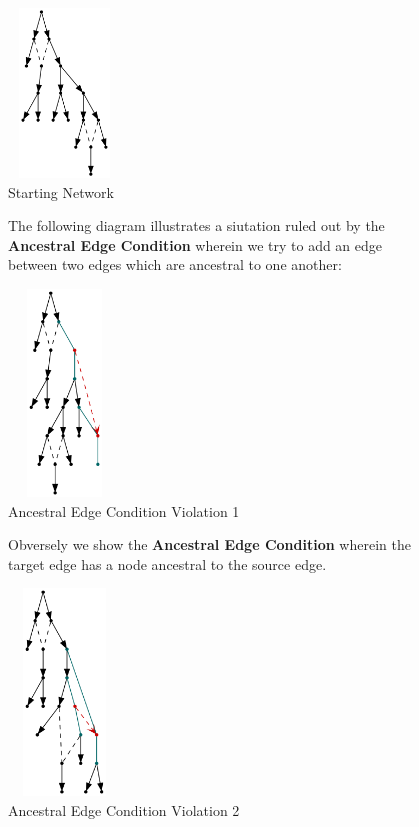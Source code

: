 \documentclass[11pt]{article}
\begin{document}
\begin{figure}
  \begin{center}
  \includegraphics[width=30mm, height=45mm]{base-network.png}
  \caption{Starting Network}
  \label{fig:base-network}
  \end{center}
\end{figure}



\begin{figure}
\noindent The following diagram illustrates a siutation ruled out by the \textbf{Ancestral Edge Condition} wherein we try to add an edge between two edges which are ancestral to one another:
\vspace{2mm}
  \begin{center}
  \includegraphics[width=30mm, height=55mm]{e2AncestralEdgeNetwork.png}
  \caption{Ancestral Edge Condition Violation 1}
  \label{fig:e2AncestralEdgeNetwork}
  \end{center}
\end{figure}

\FloatBarrier


\begin{figure}
\noindent Obversely we show the  \textbf{Ancestral Edge Condition} wherein the target edge has a node ancestral to the source edge.
\vspace{2mm}
  \begin{center}
  \includegraphics[width=30mm, height=55mm]{e1HasE2SrcDescendantNodeNetwork.png}
  \caption{Ancestral Edge Condition Violation 2}
  \label{fig:e1HasE2SrcDescendantNodeNetwork.png}
  \end{center}
\end{figure}
\end{document}
